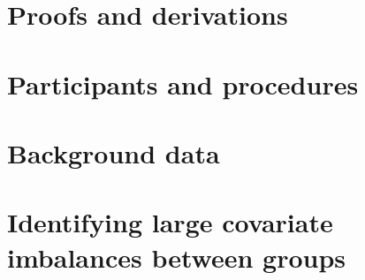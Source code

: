 \documentclass[12pt]{article}
\begin{document}
\begin{appendices}

\section{Proofs and derivations}

    \label{appendix:theory}

    


\section{Participants and procedures}

    \label{appendix:participants}

    


\section{Background data}

    \label{appendix:background}

    


\section{Identifying large covariate imbalances between groups}

    \label{appendix:largeImbalances}

    


\end{appendices}
\end{document}
